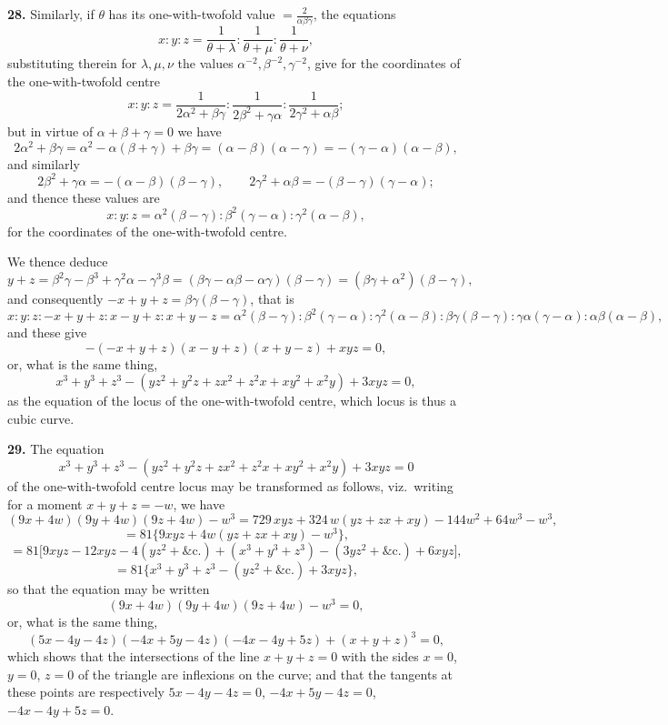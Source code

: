 \documentclass[11pt,a4paper]{article}
\begin{document}
\textbf{28.} Similarly, if $\theta$ has its one-with-twofold value $= \tfrac{2}{\alpha\beta\gamma}$, the equations
\[
x : y : z = \frac{1}{\theta + \lambda} : \frac{1}{\theta + \mu} : \frac{1}{\theta + \nu},
\]
substituting therein for $\lambda, \mu, \nu$ the values $\alpha^{-2}, \beta^{-2}, \gamma^{-2}$, give for the coordinates of the one-with-twofold centre
\[
x : y : z = \frac{1}{2\alpha^2 + \beta\gamma} : \frac{1}{2\beta^2 + \gamma\alpha} : \frac{1}{2\gamma^2 + \alpha\beta};
\]
but in virtue of $\alpha + \beta + \gamma = 0$ we have
\[
2\alpha^2 + \beta\gamma = \alpha^2 - \alpha(\beta + \gamma) + \beta\gamma = (\alpha - \beta)(\alpha - \gamma) = -(\gamma - \alpha)(\alpha - \beta),
\]
and similarly
\[
2\beta^2 + \gamma\alpha = -(\alpha - \beta)(\beta - \gamma),\qquad 2\gamma^2 + \alpha\beta = -(\beta - \gamma)(\gamma - \alpha);
\]
and thence these values are
\[
x : y : z = \alpha^2(\beta - \gamma) : \beta^2(\gamma - \alpha) : \gamma^2(\alpha - \beta),
\]
for the coordinates of the one-with-twofold centre.

We thence deduce
\[
y + z = \beta^2\gamma - \beta^3 + \gamma^2\alpha - \gamma^3\beta = (\beta\gamma - \alpha\beta - \alpha\gamma)(\beta - \gamma) = (\beta\gamma + \alpha^2)(\beta - \gamma),
\]
and consequently $-x + y + z = \beta\gamma(\beta - \gamma)$, that is
\[
x : y : z : -x + y + z : x - y + z : x + y - z = \alpha^2(\beta - \gamma) : \beta^2(\gamma - \alpha) : \gamma^2(\alpha - \beta) : \beta\gamma(\beta - \gamma) : \gamma\alpha(\gamma - \alpha) : \alpha\beta(\alpha - \beta),
\]
and these give
\[
-(-x + y + z)(x - y + z)(x + y - z) + xyz = 0,
\]
or, what is the same thing,
\[
x^3 + y^3 + z^3 - (yz^2 + y^2 z + zx^2 + z^2 x + xy^2 + x^2 y) + 3xyz = 0,
\]
as the equation of the locus of the one-with-twofold centre, which locus is thus a cubic curve.

\medskip

\textbf{29.} The equation
\[
x^3 + y^3 + z^3 - (yz^2 + y^2 z + zx^2 + z^2 x + xy^2 + x^2 y) + 3xyz = 0
\]
of the one-with-twofold centre locus may be transformed as follows, viz.\ writing for a moment $x + y + z = -w$, we have
\[
(9x + 4w)(9y + 4w)(9z + 4w) - w^3 = 729\,xyz + 324\,w(yz + zx + xy) - 144 w^2 + 64 w^3 - w^3,
\]
\[
= 81\bigl\{9xyz + 4w(yz + zx + xy) - w^3\bigr\},
\]
\[
= 81\bigl[9xyz - 12xyz - 4(yz^2 + \text{\&c.}) + (x^3 + y^3 + z^3) - (3yz^2 + \text{\&c.}) + 6xyz\bigr],
\]
\[
= 81\bigl\{x^3 + y^3 + z^3 - (yz^2 + \text{\&c.}) + 3xyz\bigr\},
\]
so that the equation may be written
\[
(9x + 4w)(9y + 4w)(9z + 4w) - w^3 = 0,
\]
or, what is the same thing,
\[
(5x - 4y - 4z)(-4x + 5y - 4z)(-4x - 4y + 5z) + (x + y + z)^3 = 0,
\]
which shows that the intersections of the line $x + y + z = 0$ with the sides $x = 0$, $y = 0$, $z = 0$ of the triangle are inflexions on the curve; and that the tangents at these points are respectively $5x - 4y - 4z = 0$, $-4x + 5y - 4z = 0$, $-4x - 4y + 5z = 0$.
\end{document}
